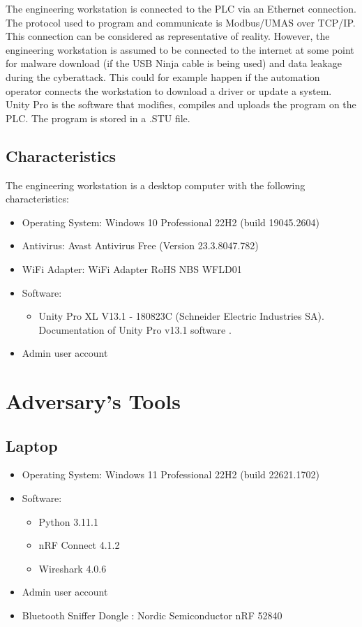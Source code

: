 The engineering workstation is connected to the PLC via an Ethernet connection. The protocol used to program and communicate is Modbus/UMAS over TCP/IP. This connection can be considered as representative of reality. However, the engineering workstation is assumed to be connected to the internet at some point for malware download (if the USB Ninja cable is being used) and data leakage during the cyberattack. This could for example happen if the automation operator connects the workstation to download a driver or update a system. Unity Pro is the software that modifies, compiles and uploads the program on the PLC. The program is stored in a .STU file.

\subsection{Characteristics}

The engineering workstation is a desktop computer with the following characteristics:

\begin{itemize}
    \item Operating System: Windows 10 Professional 22H2 (build 19045.2604)
    \item Antivirus: Avast Antivirus Free (Version 23.3.8047.782)
    \item WiFi Adapter: WiFi Adapter RoHS NBS WFLD01
    \item Software:
    \begin{itemize}
        \item Unity Pro XL V13.1 - 180823C (Schneider Electric Industries SA). Documentation of Unity Pro v13.1 software \cite{docUnityPro}.
    \end{itemize}
    \item Admin user account
\end{itemize}

\section{Adversary's Tools}

\subsection{Laptop}

\begin{itemize}
    \item Operating System: Windows 11 Professional 22H2 (build 22621.1702)
    \item Software:
    \begin{itemize}
        \item Python 3.11.1
        \item nRF Connect 4.1.2
        \item Wireshark 4.0.6
    \end{itemize}
    \item Admin user account
    \item Bluetooth Sniffer Dongle : Nordic Semiconductor nRF 52840
\end{itemize}

